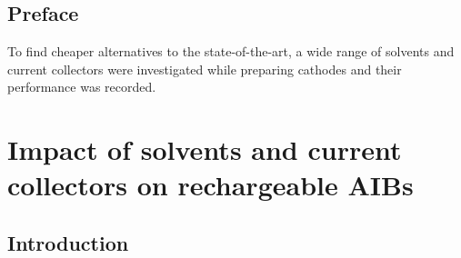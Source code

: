 \section*{Preface}
To find cheaper alternatives to the state-of-the-art, a wide range of solvents and current collectors were investigated while preparing cathodes and their performance was recorded.   
\newpage

\chapter{Impact of solvents and current collectors on rechargeable AIBs} %
\label{chap7} %

\section{Introduction}


